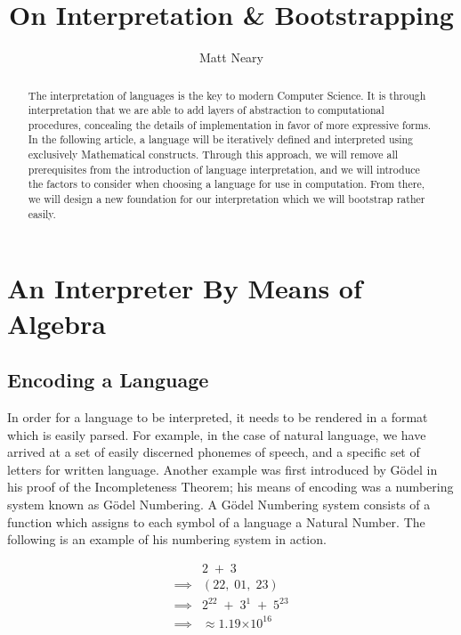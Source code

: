 \documentclass{article}
\providecommand{\e}[1]{\ensuremath{\times 10^{#1}}}
\begin{document}
\begin{titlepage}
\title{On Interpretation \& Bootstrapping}
\author{Matt Neary}
\maketitle
\begin{abstract}
The interpretation of languages is the key to modern Computer Science. It is through interpretation
that we are able to add layers of abstraction to computational procedures, concealing the details of
implementation in favor of more expressive forms. In the following article, a language will be 
iteratively defined and interpreted using exclusively Mathematical constructs. Through this approach,
we will remove all prerequisites from the introduction of language interpretation, and we will
introduce the factors to consider when choosing a language for use in computation. From there, we
will design a new foundation for our interpretation which we will bootstrap rather easily.
\end{abstract}
\thispagestyle{empty}
\end{titlepage}

\section{An Interpreter By Means of Algebra}
\subsection{Encoding a Language}
In order for a language to be interpreted, it needs to be rendered in a format which is easily
parsed. For example, in the case of natural language, we have arrived at a set of easily discerned
phonemes of speech, and a specific set of letters for written language. Another example was first
introduced by G\"odel in his proof of the Incompleteness Theorem; his means of encoding was a
numbering system known as G\"odel Numbering. A G\"odel Numbering system consists of a function
which assigns to each symbol of a language a Natural Number. The following is an example of his 
numbering system in action.

\begin{align*}
    &2 \; + \; 3
\\ \implies &(22, \; 01, \; 23)
\\ \implies &2^{22} \; + \; 3^{1} \; + \; 5^{23}
\\ \implies &\approx 1.19\e{16}
\end{align*}
\end{document}
